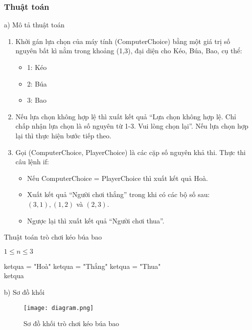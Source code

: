 \documentclass[a4paper]{article}
\begin{document}
\subsubsection{Thuật toán}
a) Mô tả thuật toán
\begin{enumerate}
    \item Khởi gán lựa chọn của máy tính (ComputerChoice) bằng một giá trị số nguyên bất kì nằm trong khoảng (1,3), đại diện cho Kéo, Búa, Bao, cụ thể:
    \begin{itemize}
        \item 1: Kéo
        \item 2: Búa
        \item 3: Bao
    \end{itemize}
    
    \item Nếu lựa chọn không hợp lệ thì xuất kết quả “Lựa chọn không hợp lệ. Chỉ chấp nhận lựa chọn là số nguyên từ 1-3. Vui lòng chọn lại”. Nếu lựa chọn hợp lại thì thực hiện bước tiếp theo.
    
    \item Gọi (ComputerChoice, PlayerChoice) là các cặp số nguyên khả thi. Thực thi câu lệnh if:  
    \begin{itemize}
        \item Nếu ComputerChoice = PlayerChoice thì xuất kết quả Hoà.
        
        \item Xuất kết quả “Người chơi thắng” trong khi có các bộ số sau: $(3,1),(1,2)$ và $(2,3)$.
        
        \item Ngược lại thì xuất kết quả “Người chơi thua”.
    \end{itemize}
\end{enumerate}

\begin{algorithm}
\caption{Thuật toán trò chơi kéo búa bao}\label{alg:cap}
\begin{algorithmic}
\Require $1 \leq n \leq 3$

    \State ketqua = "Hoà"
    \State ketqua = "Thắng"
\Else   
    \State ketqua = "Thua"
\EndIf\\
\Return ketqua
\end{algorithmic}
\end{algorithm}
\vfill
b) Sơ đồ khối
\begin{figure}[!h]
    \centering
    \texttt{[image: diagram.png]}
    \caption{Sơ đồ khối trò chơi kéo búa bao}
    \end{figure}
    
\end{document}
